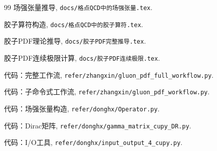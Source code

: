 \documentclass[12pt,a4paper]{ctexart}
\theoremstyle{definition}
\begin{document}
\begin{thebibliography}{99}
场强张量推导,
\texttt{docs/格点QCD中的场强张量.tex}.

胶子算符构造,
\texttt{docs/格点QCD中的胶子算符.tex}.

胶子PDF理论推导,
\texttt{docs/胶子PDF完整推导.tex}.

胶子PDF连续极限计算,
\texttt{docs/胶子PDF连续极限.tex}.

代码：完整工作流,
\texttt{refer/zhangxin/gluon\_pdf\_full\_workflow.py}.

代码：子命令式工作流,
\texttt{refer/zhangxin/gluon\_pdf\_workflow.py}.

代码：场强张量构造,
\texttt{refer/donghx/Operator.py}.

代码：Dirac矩阵,
\texttt{refer/donghx/gamma\_matrix\_cupy\_DR.py}.

代码：I/O工具,
\texttt{refer/donghx/input\_output\_4\_cupy.py}.

\end{thebibliography}
\end{document}
